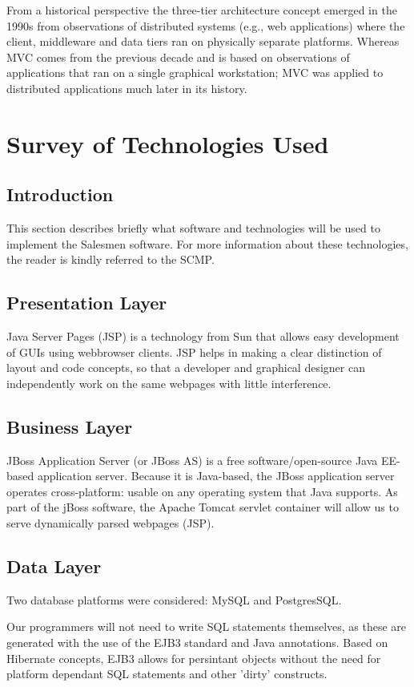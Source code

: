 \documentclass[a4paper, 12pt]{report}
\begin{document}
From a historical perspective the three-tier architecture concept emerged in the 1990s from observations of distributed systems (e.g., web applications) where the client, middleware and data tiers ran on physically separate platforms. Whereas MVC comes from the previous decade and is based on observations of applications that ran on a single graphical workstation; MVC was applied to distributed applications much later in its history.


\section{Survey of Technologies Used}
\subsection{Introduction}
This section describes briefly what software and technologies will be used to implement the Salesmen software. For more information about these technologies, the reader is kindly referred to the SCMP.
\subsection{Presentation Layer}
Java Server Pages (JSP) is a technology from Sun that allows easy development of GUIs using webbrowser clients. JSP helps in making a clear distinction of layout and code concepts, so that a developer and graphical designer can independently work on the same webpages with little interference.

\subsection{Business Layer}
JBoss Application Server (or JBoss AS) is a free software/open-source Java EE-based application server. Because it is Java-based, the JBoss application server operates cross-platform: usable on any operating system that Java supports. 
As part of the jBoss software, the Apache Tomcat servlet container will allow us to serve dynamically parsed webpages (JSP). 

\subsection{Data Layer}
Two database platforms were considered: MySQL and PostgresSQL.

Our programmers will not need to write SQL statements themselves, as these are generated with the use of the EJB3 standard and Java annotations. 
Based on Hibernate concepts, EJB3 allows for persintant objects without the need for platform dependant SQL statements and other 'dirty' constructs.
\end{document}
